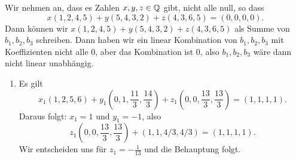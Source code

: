 \begin{parts}
	Wir nehmen an, dass es Zahlen $x,y,z\in \mathbb{Q}$ gibt, nicht alle null, so dass
	\[
	x(1,2,4,5)+y(5,4,3,2)+z(4,3,6,5)=(0,0,0,0)
	.\] 
	Dann können wir $x(1,2,4,5)+y(5,4,3,2)+z(4,3,6,5)$ als Summe von $b_1,b_2,b_3$ schreiben. Dann haben wir ein linear Kombination von $b_1,b_2,b_3$ mit Koeffizienten nicht alle 0, aber das Kombination ist $0$, also $b_1,b_2,b_3$ wäre dann nicht linear unabhängig.
\item 
	\begin{enumerate}[label=(\arabic*)]
		\item Es gilt
			 \[
			x_1(1,2,5,6)+y_1(0,1,\frac{11}{3},\frac{14}{3})+z_1(0,0,\frac{13}{3},\frac{13}{3})=(1,1,1,1)
			.\] 
			Daraus folgt: $x_1=1$ und $y_1=-1$, also
			\[
			z_1(0,0,\frac{13}{3},\frac{13}{3})+(1,1,4 / 3, 4 / 3)=(1,1,1,1).\]
Wir entscheiden uns f\"{u}r $z_1=-\frac{1}{13}$ und die Behauptung folgt.
	\end{enumerate}
\end{parts}
